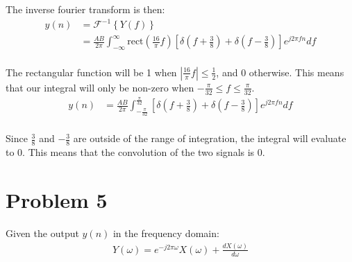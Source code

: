\documentclass{article}
\begin{document}
The inverse fourier transform is then:
\begin{align*}
    y(n) &= \mathcal{F}^{-1}\left\{Y(f)\right\} \\
    &= \frac{AB}{2\pi} \int_{-\infty}^{\infty} \text{rect}\left(\frac{16}{\pi} f\right) \left[\delta\left(f + \frac{3}{8}\right) + \delta\left(f - \frac{3}{8}\right)\right] e^{j2\pi fn} df \\
\end{align*}

The rectangular function will be 1 when $ \left|\frac{16}{\pi} f\right| \leq \frac{1}{2}$, and $0$ otherwise. This means that our integral will only be non-zero when $-\frac{\pi}{32} \leq f \leq \frac{\pi}{32}$. 
\begin{align*}
    y(n) &= \frac{AB}{2\pi} \int_{-\frac{\pi}{32}}^{\frac{\pi}{32}} \left[\delta\left(f + \frac{3}{8}\right) + \delta\left(f - \frac{3}{8}\right)\right] e^{j2\pi fn} df \\
\end{align*}

Since $\frac{3}{8}$ and $-\frac{3}{8}$ are outside of the range of integration, the integral will evaluate to 0. This means that the convolution of the two signals is 0.

\section{Problem 5}

Given the output $y(n)$ in the frequency domain:
\begin{align*}
    Y(\omega) = e^{-j2\pi \omega}X(\omega) + \frac{dX(\omega)}{d\omega}
\end{align*}
\end{document}
